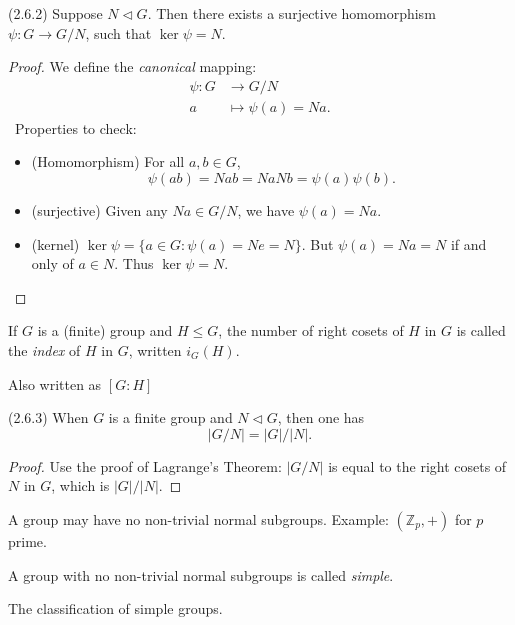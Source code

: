 
\begin{theorem}(2.6.2)
	Suppose $N \triangleleft G$. Then there exists a surjective homomorphism $\psi: G \to  G / N$, such that $\operatorname{ker} \psi = N$.
\end{theorem}
\begin{proof}
	We define the \textit{canonical} mapping:
	\begin{align*}
		\psi: G &\longrightarrow G / N \\
		a &\longmapsto \psi(a) = N a
	.\end{align*}
\	Properties to check:
	\begin{itemize}
		\item (Homomorphism) For all $a,b \in  G$, \[
			\psi(ab) = Nab = NaNb = \psi(a)\psi(b)
		.\] 
		\item (surjective) Given any $Na \in G / N$, we have $\psi(a) = Na$.
		\item (kernel) $\operatorname{ker} \psi = \{a \in G: \psi(a) = Ne = N\} $. But $\psi(a) = Na = N$ if and only of $a \in N$. Thus $\operatorname{ker} \psi = N$. 
	\end{itemize}
\end{proof}

\begin{definition}
	If $G$ is a (finite) group and $H \le G$, the number of right cosets of $H$ in $G$ is called the \textit{index} of $H$ in $G$, written $i_G(H)$.
\end{definition}
\begin{notation}
	Also written as $[G:H]$
\end{notation}

\begin{theorem}(2.6.3)
	When $G$ is a finite group and $N \triangleleft G$, then one has \[
		\left| G / N \right| = |G| / |N|
	.\] 
\end{theorem}
\begin{proof}
	Use the proof of Lagrange's Theorem: $|G / N|$ is equal to the right cosets of $N$ in $G$, which is $|G| / |N|$. 
\end{proof}

\begin{observation}
	A group may have no non-trivial normal subgroups. Example: $(\mathbb{Z}_p, +)$ for $p$ prime. 

\end{observation}
\begin{definition}
	A group with no non-trivial normal subgroups is called \textit{simple}.
\end{definition}
\begin{remark}
	The classification of simple groups.
\end{remark}

